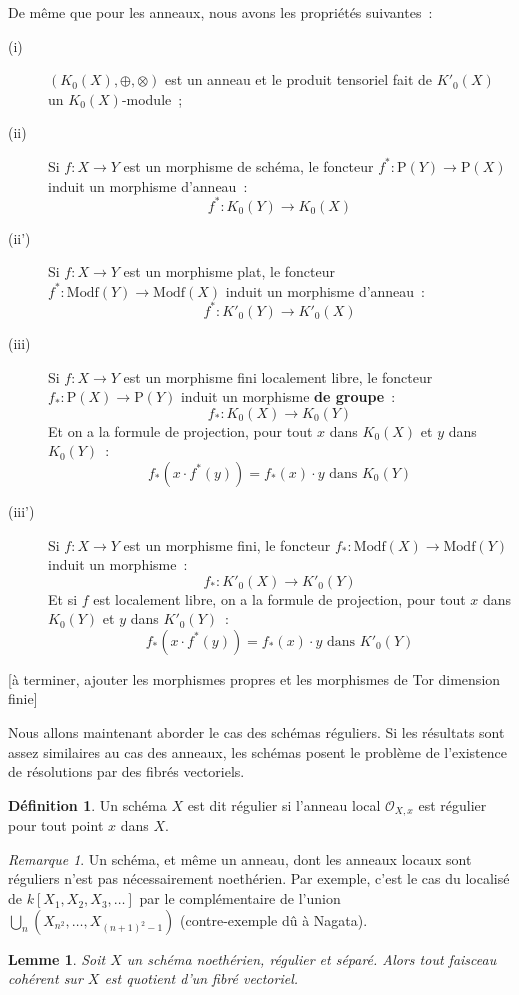 \documentclass{amsart}
\theoremstyle{plain}
\newtheorem{lem}[theo]{Lemme}
\theoremstyle{definition}
\newtheorem{defi}[theo]{Définition}
\theoremstyle{remark}
\newtheorem{rem}[theo]{Remarque}
\newcommand{\Ring}[1]{\mathcal{O}_{#1}}
\newcommand{\Proj}[1]{\mathrm{P}({#1})}
\newcommand{\Modf}[1]{\mathrm{Modf}({#1})}
\newcommand{\ra}{\rightarrow}
\newcommand{\lra}{\longrightarrow}
\begin{document}
De même que pour les anneaux, nous avons les propriétés suivantes~:
\begin{description}
  \item[(i)] $(K_0(X),\oplus,\otimes)$ est un anneau et le produit tensoriel fait de $K'_0(X)$ un $K_0(X)$-module~;
  \item[(ii)] Si $f:X\ra Y$ est un morphisme de schéma, le foncteur $f^*:\Proj{Y}\ra\Proj{X}$ induit un morphisme d'anneau~:
    $$f^*:K_0(Y)\lra K_0(X)$$
  \item[(ii')] Si $f:X\ra Y$ est un morphisme plat, le foncteur $f^*:\Modf{Y}\ra\Modf{X}$ induit un morphisme d'anneau~:
    $$f^*:K'_0(Y)\lra K'_0(X)$$
  \item[(iii)] Si $f:X\ra Y$ est un morphisme fini localement libre, le foncteur $f_*:\Proj{X}\ra\Proj{Y}$ induit un morphisme \textbf{de groupe}~:
    $$f_*:K_0(X)\lra K_0(Y)$$
    Et on a la formule de projection, pour tout $x$ dans $K_0(X)$ et $y$ dans $K_0(Y)$~:
    $$f_*(x\cdot f^*(y))=f_*(x)\cdot y\text{ dans }K_0(Y)$$
  \item[(iii')] Si $f:X\ra Y$ est un morphisme fini, le foncteur $f_*:\Modf{X}\ra\Modf{Y}$ induit un morphisme~:
    $$f_*:K'_0(X)\lra K'_0(Y)$$
    Et si $f$ est localement libre, on a la formule de projection, pour tout $x$ dans $K_0(Y)$ et $y$ dans $K'_0(Y)$~:
    $$f_*(x\cdot f^*(y))=f_*(x)\cdot y\text{ dans }K'_0(Y)$$
\end{description}


[à terminer, ajouter les morphismes propres et les morphismes de Tor dimension finie]

Nous allons maintenant aborder le cas des schémas réguliers. Si les résultats sont assez similaires au cas des anneaux,
les schémas posent le problème de l'existence de résolutions par des fibrés vectoriels.

\begin{defi}
  Un schéma $X$ est dit régulier si l'anneau local $\Ring{X,x}$ est régulier pour tout point $x$ dans $X$.
\end{defi}

\begin{rem}
  Un schéma, et même un anneau, dont les anneaux locaux sont réguliers n'est pas nécessairement noethérien. Par exemple, c'est le cas du localisé
  de $k[X_1,X_2,X_3,\dotsc]$ par le complémentaire de l'union $\bigcup_n(X_{n^2},\dotsc,X_{(n+1)^2-1})$ (contre-exemple dû à Nagata).
\end{rem}

\begin{lem}\label{RegulierSepareQuotient}
  Soit $X$ un schéma noethérien, régulier et séparé. Alors tout faisceau cohérent sur $X$ est quotient d'un fibré vectoriel.
\end{lem}
\end{document}
